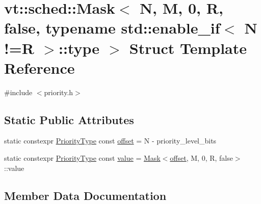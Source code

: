 \hypertarget{structvt_1_1sched_1_1_mask_3_01_n_00_01_m_00_010_00_01_r_00_01false_00_01typename_01std_1_1enabl81bb113ca3757a124cb0c647589aa3dd}{}\section{vt\+:\+:sched\+:\+:Mask$<$ N, M, 0, R, false, typename std\+:\+:enable\+\_\+if$<$ N !=R $>$\+:\+:type $>$ Struct Template Reference}
\label{structvt_1_1sched_1_1_mask_3_01_n_00_01_m_00_010_00_01_r_00_01false_00_01typename_01std_1_1enabl81bb113ca3757a124cb0c647589aa3dd}


{\ttfamily \#include $<$priority.\+h$>$}

\subsection*{Static Public Attributes}
\begin{DoxyCompactItemize}
\item 
static constexpr \hyperlink{namespacevt_a86bff9f556eb761b27fc8600d006ac04}{Priority\+Type} const \hyperlink{structvt_1_1sched_1_1_mask_3_01_n_00_01_m_00_010_00_01_r_00_01false_00_01typename_01std_1_1enabl81bb113ca3757a124cb0c647589aa3dd_a19acd4efecf001695272262bd0baa93b}{offset} = N -\/ priority\+\_\+level\+\_\+bits
\item 
static constexpr \hyperlink{namespacevt_a86bff9f556eb761b27fc8600d006ac04}{Priority\+Type} const \hyperlink{structvt_1_1sched_1_1_mask_3_01_n_00_01_m_00_010_00_01_r_00_01false_00_01typename_01std_1_1enabl81bb113ca3757a124cb0c647589aa3dd_a1f4fbcc1ba267a7c9e1585f33b0ccd52}{value} = \hyperlink{structvt_1_1sched_1_1_mask}{Mask}$<$\hyperlink{structvt_1_1sched_1_1_mask_3_01_n_00_01_m_00_010_00_01_r_00_01false_00_01typename_01std_1_1enabl81bb113ca3757a124cb0c647589aa3dd_a19acd4efecf001695272262bd0baa93b}{offset}, M, 0, R, false$>$\+::value
\end{DoxyCompactItemize}


\subsection{Member Data Documentation}
\mbox{\label{structvt_1_1sched_1_1_mask_3_01_n_00_01_m_00_010_00_01_r_00_01false_00_01typename_01std_1_1enabl81bb113ca3757a124cb0c647589aa3dd_a19acd4efecf001695272262bd0baa93b}} 
